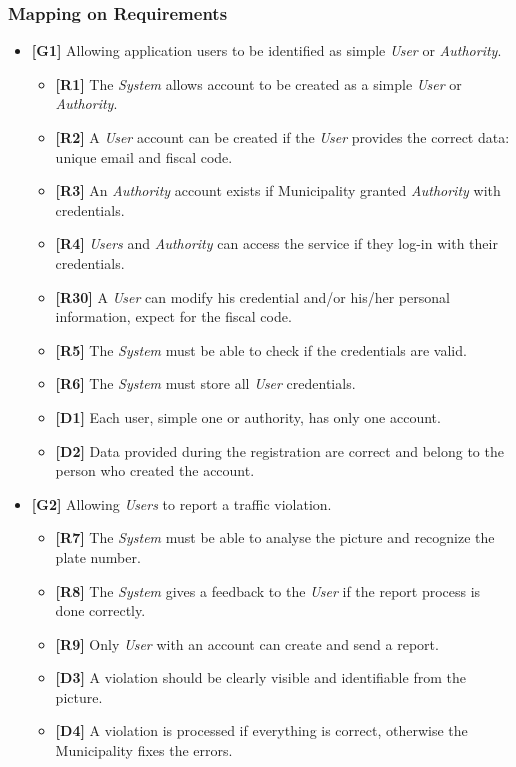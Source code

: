 \documentclass {article}
\begin{document}
	\subsubsection{Mapping on Requirements}
	\begin{itemize}
			 \item {\bf [G1]} Allowing application users to be identified as simple {\it User} or {\it Authority}.
			 \begin{itemize}
			 \item {\bf [R1]} The {\it System} allows account to be created as a simple {\it User} or {\it Authority}.
			 \item {\bf [R2]} A {\it User} account can be created if the {\it User} provides the correct data: unique email and fiscal code. 
			 \item {\bf [R3]} An {\it Authority} account exists if Municipality granted {\it Authority} with credentials. 
			 \item {\bf [R4]} {\it Users} and {\it Authority} can access the service if they log-in with their credentials.
			 \item {\bf [R30]} A {\it User} can modify his credential and/or his/her personal information, expect for the fiscal code.
			 \item {\bf [R5]} The {\it System} must be able to check if the credentials are valid.
			 \item {\bf [R6]} The {\it System} must store all {\it User} credentials. 
			 \item {\bf [D1]} Each user, simple one or authority, has only one account.
			 \item {\bf [D2]} Data provided during the registration are correct and belong to the person who created the account.
			 \end{itemize}
   			 \item {\bf [G2]} Allowing {\it Users} to report a traffic violation.		
   			 \begin{itemize}
   			 \item {\bf [R7]} The {\it System} must be able to analyse the picture and recognize the plate number. 
   			 \item {\bf [R8]} The {\it System} gives a feedback to the {\it User} if the report process is done correctly.
   			 \item {\bf [R9]} Only {\it User} with an account can create and send a report.
   			 \item {\bf [D3]} A violation should be clearly visible and identifiable from the picture.
   			 \item {\bf [D4]} A violation is processed if everything is correct, otherwise the Municipality fixes the errors.

\end{itemize}
\end{itemize}
\end{document}
